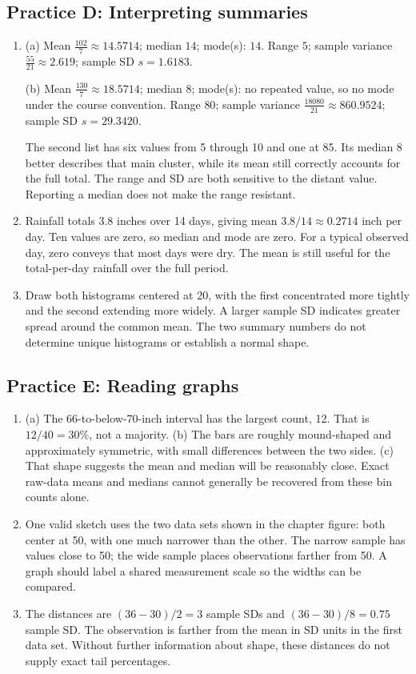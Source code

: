 \subsection*{Practice D: Interpreting summaries}
\begin{enumerate}[label=D\arabic*.,leftmargin=2.5em,itemsep=10pt]
\item (a) Mean $\frac{102}{7}\approx 14.5714$; median $14$; mode(s): $14$. Range $5$; sample variance $\frac{55}{21}\approx 2.619$; sample SD $s=1.6183$.

(b) Mean $\frac{130}{7}\approx 18.5714$; median $8$; mode(s): no repeated value, so no mode under the course convention. Range $80$; sample variance $\frac{18080}{21}\approx 860.9524$; sample SD $s=29.3420$.

The second list has six values from 5 through 10 and one at 85. Its median 8 better describes that main cluster, while its mean still correctly accounts for the full total. The range and SD are both sensitive to the distant value. Reporting a median does not make the range resistant.
\item Rainfall totals 3.8 inches over 14 days, giving mean $3.8/14\approx0.2714$ inch per day. Ten values are zero, so median and mode are zero. For a typical observed day, zero conveys that most days were dry. The mean is still useful for the total-per-day rainfall over the full period.
\item Draw both histograms centered at 20, with the first concentrated more tightly and the second extending more widely. A larger sample SD indicates greater spread around the common mean. The two summary numbers do not determine unique histograms or establish a normal shape.
\end{enumerate}

\subsection*{Practice E: Reading graphs}
\begin{enumerate}[label=E\arabic*.,leftmargin=2.5em,itemsep=10pt]
\item (a) The 66-to-below-70-inch interval has the largest count, 12. That is $12/40=30\%$, not a majority. (b) The bars are roughly mound-shaped and approximately symmetric, with small differences between the two sides. (c) That shape suggests the mean and median will be reasonably close. Exact raw-data means and medians cannot generally be recovered from these bin counts alone.
\item One valid sketch uses the two data sets shown in the chapter figure: both center at 50, with one much narrower than the other. The narrow sample has values close to 50; the wide sample places observations farther from 50. A graph should label a shared measurement scale so the widths can be compared.
\item The distances are $(36-30)/2=3$ sample SDs and $(36-30)/8=0.75$ sample SD. The observation is farther from the mean in SD units in the first data set. Without further information about shape, these distances do not supply exact tail percentages.
\end{enumerate}

